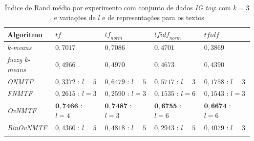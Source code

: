 \documentclass[
    12pt,                %
    oneside,            %
    a4paper,            %
    english,            %
    brazil                %
    ]{abntex2ppgsi}
\begin{document}
\begin{table}[H]
\centering
    \caption{Índice de Rand médio por experimento com conjunto de dados \textit{IG toy}: com $k = 3$ , e variações de $l$ e de representações para os textos}
    \begin{tabular}{lllll}
        \hline
        \textbf{Algoritmo}              & $\textit{tf}$ & $\textit{tf}_{norm}$ & $\textit{tfidf}_{norm}$ & $\textit{tfidf}$ \\
        \hline
        \textit{k-means}       & $0,7017$                    & $0,7086$           & $0,4701$           & $0,3869$           \\
        \textit{fuzzy k-means} & $0,4966$                    & $0,4970$           & $0,4673$           & $0,4390$           \\
        \textit{ONMTF}         & $0,3372$ : $l = 5$          & $0,6479$ : $l = 5$ & $0,5717$ : $l = 3$ & $0,1758$ : $l = 3$ \\
        \textit{FNMTF}         & $0,2615$ : $l = 3$          & $0,2590$ : $l = 3$ & $0,1535$ : $l = 6$ & $0,1543$ : $l = 3$ \\
        \textit{OvNMTF}        & $\mathbf{0,7466}$ : $l = 4$ & $\mathbf{0,7487}$ : $l = 3$ & $\mathbf{0,6755}$ : $l = 6$ & $\mathbf{0,6674}$ : $l = 6$ \\
        \textit{BinOvNMTF}     & $0,4360$ : $l = 5$          & $0,4818$ : $l = 5$ & $0,2943$ : $l = 5$ & $0,4079$ : $l = 3$ \\
        \hline \\
    \end{tabular}
    \label{tab:experiments-quant-rand:igtoy}
\end{table}
\end{document}
